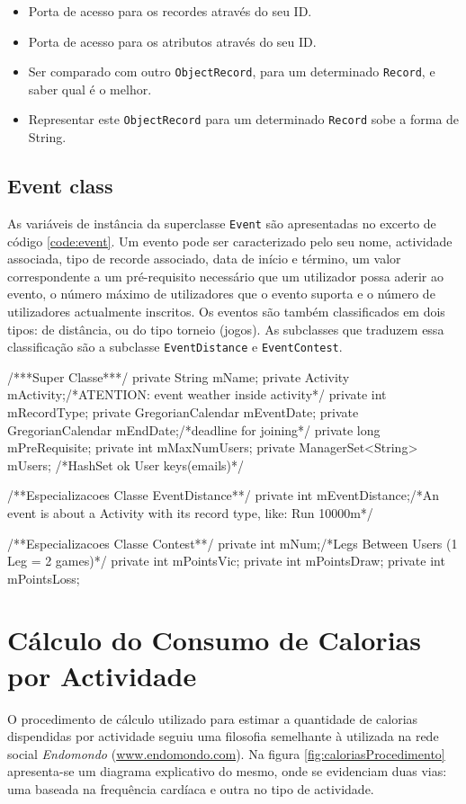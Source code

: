 \documentclass[a4paper,10pt]{report}
\begin{document}
\begin{itemize}
 \item Porta de acesso para os recordes através do seu ID.
 \item Porta de acesso para os atributos através do seu ID.
 \item Ser comparado com outro \verb!ObjectRecord!, para um determinado \verb!Record!, e saber qual é o melhor.
 \item Representar este \verb!ObjectRecord! para um determinado \verb!Record! sobe a forma de String.
\end{itemize}

\section{Event class}
\label{sec:event}
As variáveis de instância da superclasse \verb!Event! são apresentadas no excerto de código \ref{code:event}.
Um evento pode ser caracterizado pelo seu nome, actividade associada, tipo de recorde associado, 
data de início e término, um valor correspondente a um pré-requisito necessário que um utilizador possa aderir ao evento, 
o número máximo de utilizadores que o evento suporta e o número de utilizadores actualmente inscritos.
Os eventos são também classificados em dois tipos: de distância, ou do tipo torneio (jogos).
As subclasses que traduzem essa classificação são a subclasse \verb!EventDistance! e \verb!EventContest!.

\begin{code}[caption=Variáveis de instância da superclasse Event e subclasses respectivas (src/model/event)., label=code:event]
/***Super Classe***/
private String mName;
private Activity mActivity;/*ATENTION: event weather inside activity*/
private int mRecordType;
private GregorianCalendar mEventDate;
private GregorianCalendar mEndDate;/*deadline for joining*/
private long mPreRequisite;
private int mMaxNumUsers;
private ManagerSet<String> mUsers; /*HashSet ok User keys(emails)*/

/**Especializacoes Classe EventDistance**/
private int mEventDistance;/*An event is about a Activity with its record type, like: Run 10000m*/

/**Especializacoes Classe Contest**/
private int mNum;/*Legs Between Users (1 Leg = 2 games)*/
private int mPointsVic;
private int mPointsDraw;
private int mPointsLoss;
\end{code}

\chapter{Cálculo do Consumo de Calorias por Actividade}
\label{cap:calorias}
O procedimento de cálculo utilizado para estimar a quantidade de calorias dispendidas por actividade seguiu uma filosofia semelhante à utilizada 
na rede social \emph{Endomondo} (\url{www.endomondo.com}). 
Na figura \ref{fig:caloriasProcedimento} apresenta-se um diagrama explicativo do mesmo, onde se evidenciam duas vias: uma baseada na frequência 
cardíaca e outra no tipo de actividade.
\end{document}
